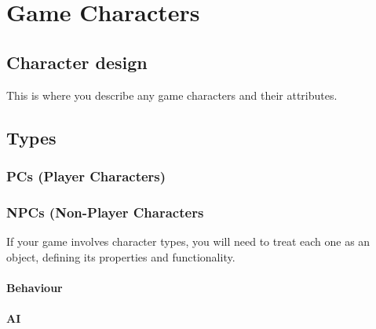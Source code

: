 \chapter{Game Characters}
\section{Character design} %
This is where you describe any game characters and their attributes.

\section{Types} %
\subsection{PCs (Player Characters)} %
\subsection{NPCs (Non-Player Characters} %
If your game involves character types, you will need to treat each one as an object, defining its properties and functionality.
\subsubsection{Behaviour} %
\subsubsection{AI} %
